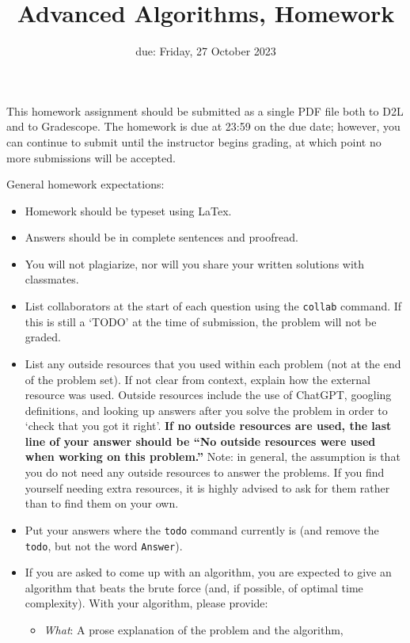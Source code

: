 \documentclass{article}
\title{Advanced Algorithms, Homework \hwnum}
\author{\todo{Your Name Here}}
\date{due: Friday, 27 October 2023}
\begin{document}
\maketitle

This homework assignment should be
submitted as a single PDF file both to D2L and to Gradescope.  The homework is
due at 23:59 on the due date; however, you can continue to submit until the
instructor begins grading, at which point no more submissions will be accepted.

General homework expectations:
\begin{itemize}
    \item Homework should be typeset using LaTex.
    \item Answers should be in complete sentences and proofread.
    \item You will not plagiarize, nor will you share your written solutions
        with classmates.
    \item List collaborators at the start of each question using the
        \texttt{collab} command. If this is still a `TODO' at the time of
        submission, the problem will not
        be graded.
    \item List any outside resources that you used within each problem (not at
        the end of the problem set). If not clear from context, explain how the
        external resource was used.  Outside resources include the use of
        ChatGPT, googling definitions, and looking up answers after you solve
        the problem in order to `check that you got it right'.  {\bf If no outside resources are
        used, the last line of your answer should be ``No outside resources were
        used when working on this problem.''}  Note: in general, the assumption
        is that you do not need any outside resources to answer the problems.
        If you find yourself needing extra resources, it is highly advised to
        ask for them rather than to find them on your own.
    \item Put your answers where the \texttt{todo} command currently is (and
        remove the \texttt{todo}, but not the word \texttt{Answer}).
    \item If you are asked to come up with an algorithm, you are
        expected to give an algorithm that beats the brute force (and, if possible, of
        optimal time complexity). With your algorithm, please provide:
        \begin{itemize}
            \item \emph{What}: A prose explanation of the problem and the algorithm,

\end{itemize}
\end{itemize}
\end{document}
